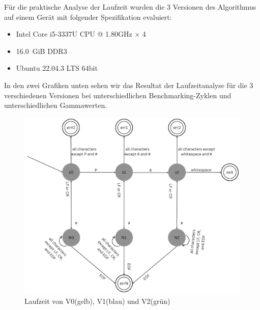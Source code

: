 \documentclass[course=erap]{aspdoc}
\begin{document}
\par
Für die praktische Analyse der Laufzeit wurden die 3 Versionen des Algorithmus auf einem Gerät mit folgender Spezifikation evaluiert:

\begin{itemize}
\item Intel Core i5-3337U CPU @ 1.80GHz × 4
\item 16.0 GiB DDR3
\item Ubuntu 22.04.3 LTS 64bit
\end{itemize}

\par
In den zwei Grafiken unten sehen wir das Resultat der Laufzeitanalyse für die 3 verschiedenen Versionen bei unterschiedlichen Benchmarking-Zyklen und unterschiedlichen Gammawerten.

\begin{figure}[h]
\begin{minipage}{0.55\textwidth}
\centering
\includegraphics[width=\textwidth]{Bilder/auto1.png}
\caption{Laufzeit von V0(gelb), V1(blau) und V2(grün)}
\end{minipage}
\hfill
\begin{minipage}{0.55\textwidth}
\centering

\end{minipage}
\end{figure}
\end{document}
